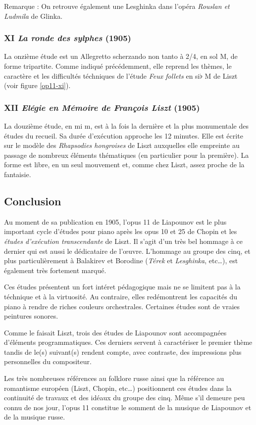 Remarque : On retrouve également une Lesghinka dans l'opéra \emph{Rouslan et Ludmila} de Glinka.

\newpage

\subsubsection{XI \emph{La ronde des sylphes} (1905)}

La onzième étude est un Allegretto scherzando non tanto à 2/4, en sol M, de forme tripartite. Comme indiqué précédemment, elle reprend les thèmes, le caractère et les difficultés téchniques de l'étude \emph{Feux follets} en si$\flat$ M de Liszt (voir figure \ref{op11-xi}).

\subsubsection{XII \emph{Elégie en Mémoire de François Liszt} (1905)}

La douzième étude, en mi m, est à la fois la dernière et la plus monumentale des études du recueil. Sa durée d'exécution approche les 12 minutes. Elle est écrite sur le modèle des \emph{Rhapsodies hongroises} de Liszt auxquelles elle empreinte au passage de nombreux éléments thématiques (en particulier pour la première). La forme est libre, en un seul mouvement et, comme chez Liszt, assez proche de la fantaisie.

\subsection{Conclusion}

Au moment de sa publication en 1905, l'opus 11 de Liapounov est le plus important cycle d'études pour piano après les opus 10 et 25 de Chopin et les \emph{études d'exécution transcendante} de Liszt. Il s'agit d'un très bel hommage à ce dernier qui est aussi le dédicataire de l'œuvre. L'hommage au groupe des cinq, et plus particulièrement à Balakirev et Borodine (\emph{Térek} et \emph{Lesghinka}, etc\ldots), est également très fortement marqué.

Ces études présentent un fort intéret pédagogique mais ne se limitent pas à la téchnique et à la virtuosité. Au contraire, elles redémontrent les capacités du piano à rendre de riches couleurs orchestrales. Certaines études sont de vraies peintures sonores.

Comme le faisait Liszt, trois des études de Liapounov sont accompagnées d'éléments programmatiques. Ces derniers servent à caractériser le premier thème tandis de le(s) suivant(s) rendent compte, avec contraste, des impressions plus personnelles du compositeur.

Les très nombreuses références au folklore russe ainsi que la référence au romantisme européen (Liszt, Chopin, etc\ldots) positionnent ces études dans la continuité de travaux et des idéaux du groupe des cinq. Même s'il demeure peu connu de nos jour, l'opus 11 constitue le somment de la musique de Liapounov et de la musique russe.

